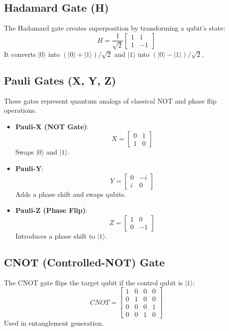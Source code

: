 \documentclass[a4paper,12pt]{article}
\begin{document}
\subsection{Hadamard Gate (H)}
The Hadamard gate creates superposition by transforming a qubit's state:
\begin{equation}
H = \frac{1}{\sqrt{2}}
\begin{bmatrix} 1 & 1 \\ 1 & -1 \end{bmatrix}
\end{equation}
It converts $|0\rangle$ into $(|0\rangle + |1\rangle)/\sqrt{2}$ and $|1\rangle$ into $(|0\rangle - |1\rangle)/\sqrt{2}$.

\subsection{Pauli Gates (X, Y, Z)}
These gates represent quantum analogs of classical NOT and phase flip operations.
\begin{itemize}
    \item \textbf{Pauli-X (NOT Gate)}:
    \begin{equation} X = \begin{bmatrix} 0 & 1 \\ 1 & 0 \end{bmatrix} \end{equation}
    Swaps $|0\rangle$ and $|1\rangle$.
    \item \textbf{Pauli-Y}:
    \begin{equation} Y = \begin{bmatrix} 0 & -i \\ i & 0 \end{bmatrix} \end{equation}
    Adds a phase shift and swaps qubits.
    \item \textbf{Pauli-Z (Phase Flip)}:
    \begin{equation} Z = \begin{bmatrix} 1 & 0 \\ 0 & -1 \end{bmatrix} \end{equation}
    Introduces a phase shift to $|1\rangle$.
\end{itemize}

\subsection{CNOT (Controlled-NOT) Gate}
The CNOT gate flips the target qubit if the control qubit is $|1\rangle$:
\begin{equation}
CNOT = \begin{bmatrix} 1 & 0 & 0 & 0 \\ 0 & 1 & 0 & 0 \\ 0 & 0 & 0 & 1 \\ 0 & 0 & 1 & 0 \end{bmatrix}
\end{equation}
Used in entanglement generation.
\end{document}
